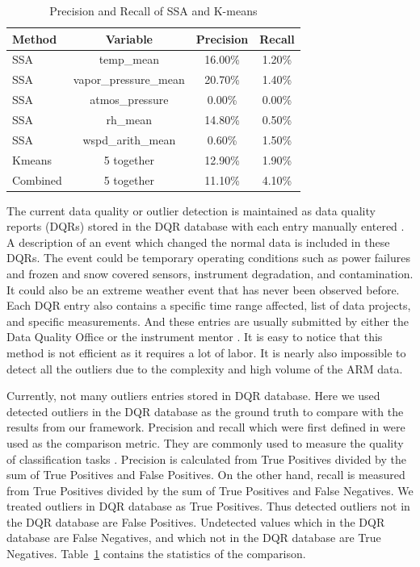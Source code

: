 \documentclass[letterpaper, 10 pt, conference]{ieeeconf}  %
\begin{document}
\begin{table}[ht]
\caption{Precision and Recall of SSA and K-means}
\label{tab:pr}
\centering
\begin{tabular}{|l|c|c|c|}
\hline
Method & Variable & Precision & Recall\\
\hline
SSA & temp\_mean & 16.00\% & 1.20\%\\
SSA & vapor\_pressure\_mean & 20.70\% & 1.40\%\\
SSA & atmos\_pressure & 0.00\% & 0.00\%\\
SSA & rh\_mean & 14.80\% & 0.50\%\\
SSA & wspd\_arith\_mean & 0.60\% & 1.50\%\\
Kmeans & 5 together & 12.90\% & 1.90\%\\
Combined & 5 together & 11.10\% & 4.10\%\\
\hline
\end{tabular}
\end{table}

The current data quality or outlier detection is maintained as data quality reports (DQRs) stored in the DQR database with each entry manually entered \cite{mccord2016arm}. A description of an event which changed the normal data is included in these DQRs. The event could be temporary operating conditions such as power failures and frozen and snow covered sensors, instrument degradation, and contamination. It could also be an extreme weather event that has never been observed before. Each DQR entry also contains a specific time range affected, list of data projects, and specific measurements. And these entries are usually submitted by either the Data Quality Office \cite{peppler2016arm} or the instrument mentor \cite{cress2016deploying}. It is easy to notice that this method is not efficient as it requires a lot of labor. It is nearly also impossible to detect all the outliers due to the complexity and high volume of the ARM data.

Currently, not many outliers entries stored in DQR database. Here we used detected outliers in the DQR database as the ground truth to compare with the results from our framework. Precision and recall which were first defined in \cite{perry1955machine} were used as the comparison metric. They are commonly used to measure the quality of classification tasks \cite{olson2008advanced}. Precision is calculated from True Positives divided by the sum of True Positives and False Positives. On the other hand, recall is measured from True Positives divided by the sum of True Positives and False Negatives. We treated outliers in DQR database as True Positives. Thus detected outliers not in the DQR database are False Positives. Undetected values which in the DQR database are False Negatives, and which not in the DQR database are True Negatives. Table~\ref{tab:pr} contains the statistics of the comparison.
\end{document}
